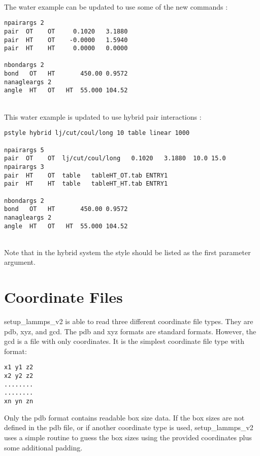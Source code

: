 \documentclass[12pt,letterpaper,]{article}
\begin{document}
\newpage
\\
The water example can be updated to use some of the new commands :
\begin{verbatim}
npairargs 2
pair  OT    OT     0.1020   3.1880  
pair  HT    OT    -0.0000   1.5940
pair  HT    HT     0.0000   0.0000

nbondargs 2
bond   OT   HT       450.00 0.9572
nanagleargs 2
angle  HT   OT   HT  55.000 104.52
\end{verbatim}
\\
This water example is updated to use hybrid pair interactions :
\begin{verbatim}
pstyle hybrid lj/cut/coul/long 10 table linear 1000 

npairargs 5
pair  OT    OT  lj/cut/coul/long   0.1020   3.1880  10.0 15.0
npairargs 3
pair  HT    OT  table   tableHT_OT.tab ENTRY1
pair  HT    HT  table   tableHT_HT.tab ENTRY1

nbondargs 2 
bond   OT   HT       450.00 0.9572
nanagleargs 2
angle  HT   OT   HT  55.000 104.52
\end{verbatim}
\\
Note that in the hybrid system the style should be listed as the first parameter argument. 

\section{Coordinate Files}
setup\_lammps\_v2 is able to read three different coordinate file types. They are pdb, xyz, and gcd. The pdb and xyz formats are standard formats. However, the gcd is a file with only coordinates. It is the simplest coordinate file type with format:
\begin{verbatim}
x1 y1 z2
x2 y2 z2
........
........
xn yn zn
\end{verbatim}

Only the pdb format contains readable box size data. If the box sizes are not defined in the pdb file, or if another coordinate type is used, setup\_lammps\_v2 uses a simple
routine to guess the box sizes using the provided coordinates plus some additional padding. 
\end{document}
